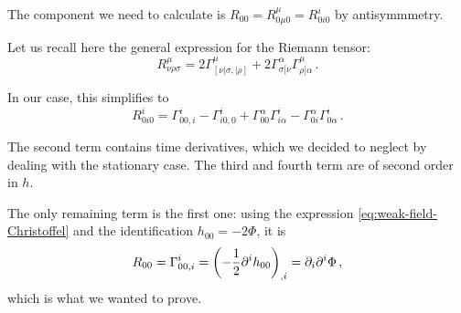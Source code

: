 \documentclass[main.tex]{subfiles}
\begin{document}
The component we need to calculate is \(R_{00 } = R^{\mu }_{0 \mu 0} = R^{i}_{0i0}\) by antisymmmetry.

Let us recall here the general expression for the Riemann tensor: 
%
\begin{equation}
  R^{\mu }_{\nu \rho \sigma } =
  2 \Gamma^{\mu }_{[\nu| \sigma, |\rho]} + 2 \Gamma^{\alpha }_{\sigma [\nu} \Gamma^{\mu }_{\rho ] \alpha }
\,.
\end{equation}

In our case, this simplifies to 
%
\begin{equation}
  R^{i}_{0i0} = 
  \Gamma^{i}_{00, i} 
  - \Gamma^{i}_{i0, 0}
  + \Gamma^{\alpha }_{00} \Gamma^{i}_{i \alpha }
  - \Gamma^{\alpha }_{0i} \Gamma^{i}_{0 \alpha }
\,.
\end{equation}
%

The second term contains time derivatives, which we decided to neglect by dealing with the stationary case.
The third and fourth term are of second order in \(h\).

The only remaining term is the first one: using the expression \eqref{eq:weak-field-Christoffel} and the identification \(h_{00} = -2 \Phi \), it is
%
\begin{equation}
  R_{00} = \Gamma^{i}_{00, i} = \qty(-\frac{1}{2}\partial^{i}h_{00})_{,i} = \partial_{i}  \partial^{i} \Phi 
\,,
\end{equation}
%
which is what we wanted to prove.
\end{document}
